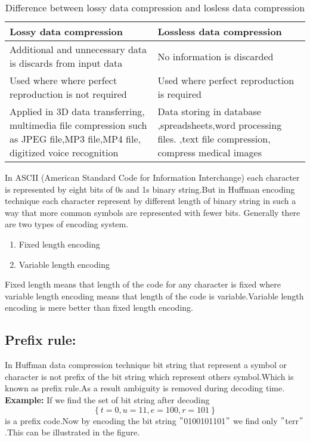 \documentclass[conference]{IEEEtran}
\begin{document}
\begin{table}[h!]
   
        
    
\caption{Difference between lossy data compression and losless data compression} 
  \label{table:lossy}
  \begin{tabu} to 0.5 \textwidth  {|X[l]|X[l]|}
  \hline
      Lossy data compression & 
       Lossless data compression\\
       \hline
       Additional and unnecessary
       data is discards from input data\cite{nelson1995data}
       & No information is discarded\cite{nelson1995data}\\
       \hline
       Used where where perfect reproduction is not required\cite{ng1997lossless} & Used where perfect reproduction is required\cite{ng1997lossless}\\
       \hline
       Applied in 3D data transferring, multimedia file compression such as JPEG file,MP3 file,MP4 file, digitized voice recognition\cite{nelson1995data,ng1997lossless} & Data storing in database ,spreadsheets,word processing files. ,text file compression, compress medical images\cite{nelson1995data,ng1997lossless}\\
       \hline
      
  \end{tabu}
  
    
\end{table}
In ASCII (American Standard Code for Information Interchange)  each character is represented by eight bits of 0s and 1s binary string.But in Huffman encoding technique each character represent by different length of binary string in such a way that more common symbols are represented with fewer bits.\cite{han2015deep}
Generally there are two types of encoding system.
\begin{enumerate}
\label{list:into2}
  \item Fixed length encoding 
  \item Variable length encoding
\end{enumerate}
Fixed length means that length of the code for any character is fixed where variable length encoding means that length of the code is variable.Variable length encoding is mere better than fixed length encoding.\cite{cormen2009introduction}

\subsection{\textbf{Prefix rule:}}
In Huffman data compression technique bit string that represent a symbol or character is not prefix of the bit string which represent others symbol.\cite{cormen2009introduction}Which is known as prefix rule.As a result  ambiguity is removed during decoding time. \\
\textbf{Example:} If we find the set of bit string after decoding \[ \left \{t=0,u=11,e=100,r=101 \right\} \] is a prefix code.Now by encoding the bit string $"$0100101101$"$ we find only $"$terr$"$.This can be illustrated in the figure.
\end{document}
